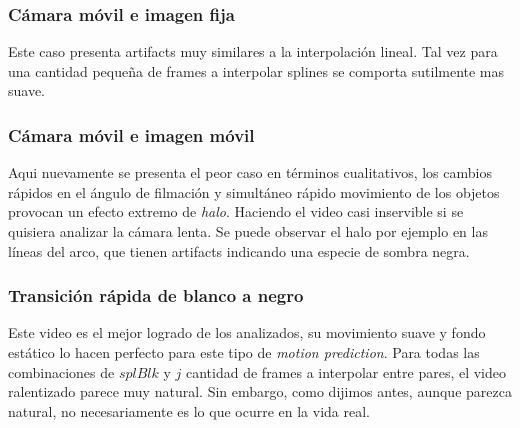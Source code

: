\subsubsection*{Cámara móvil e imagen fija}
Este caso presenta artifacts muy similares a la interpolación lineal. Tal vez para una cantidad pequeña de frames a interpolar splines se comporta sutilmente mas suave.

\subsubsection*{Cámara móvil e imagen móvil}
Aqui nuevamente se presenta el peor caso en términos cualitativos, los cambios rápidos en el ángulo de filmación y simultáneo rápido movimiento de los objetos provocan un efecto extremo de \emph{halo}. Haciendo el video casi inservible si se quisiera analizar la cámara lenta. Se puede observar el halo por ejemplo en las líneas del arco, que tienen artifacts indicando una especie de sombra negra. 

\subsubsection*{Transición rápida de blanco a negro}
Este video es el mejor logrado de los analizados, su movimiento suave y fondo estático lo hacen perfecto para este tipo de \emph{motion prediction}. Para todas las combinaciones de $splBlk$ y $j$ cantidad de frames a interpolar entre pares, el video ralentizado parece muy natural. Sin embargo, como dijimos antes, aunque parezca natural, no necesariamente es lo que ocurre en la vida real.

